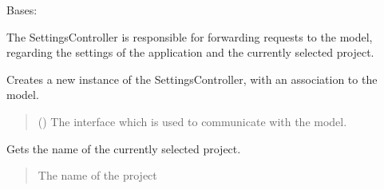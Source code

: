 \documentclass[letterpaper,10pt,english]{sphinxmanual}
\begin{document}
\begin{fulllineitems}
\label{\detokenize{apidoc/src.osm_configurator.control:src.osm_configurator.control.settings_controller.SettingsController}}
\pysigstartsignatures
{}
\pysigstopsignatures
\sphinxAtStartPar
Bases: 

\sphinxAtStartPar
The SettingsController is responsible for forwarding requests to the model,
regarding the settings of the application and the currently selected project.

\begin{fulllineitems}
\label{\detokenize{apidoc/src.osm_configurator.control:src.osm_configurator.control.settings_controller.SettingsController.__init__}}
\pysigstartsignatures
{}
\pysigstopsignatures
\sphinxAtStartPar
Creates a new instance of the SettingsController, with an association to the model.
\begin{quote}\begin{description}
\sphinxAtStartPar
{} ({\hyperref[\detokenize{apidoc/src.osm_configurator.model.application:src.osm_configurator.model.application.application_interface.IApplication}]{}}) \textendash{} The interface which is used to communicate with the model.

\end{description}\end{quote}

\end{fulllineitems}


\begin{fulllineitems}
\label{\detokenize{apidoc/src.osm_configurator.control:src.osm_configurator.control.settings_controller.SettingsController.get_project_name}}
\pysigstartsignatures
{}
\pysigstopsignatures
\sphinxAtStartPar
Gets the name of the currently selected project.
\begin{quote}\begin{description}
\sphinxAtStartPar
The name of the project


\end{description}
\end{quote}
\end{fulllineitems}
\end{fulllineitems}
\end{document}

